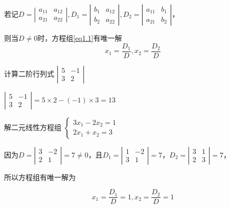 若记$D= \left|\begin{array}{ccc}
        a_{11} & a_{12} \\
        a_{21} & a_{22}
    \end{array}\right| , D_1=\left|\begin{array}{ccc}
        b_1 & a_{12} \\
        b_2 & a_{22}
    \end{array}\right| ,D_2= \left|\begin{array}{ccc}
        a_{11} & b_1 \\
        a_{21} & b_2
    \end{array}\right|  $，

则当$D \ne 0 $时，方程组\ref{eq1.1}有唯一解
$$
    x_1=\frac{D_1}{D},x_2=\frac{D_2}{D}
$$

\begin{example}
    计算二阶行列式
    $\left|\begin{array}{ccc}
            5 & -1 \\
            3 & 2
        \end{array}\right| $
\end{example}

\begin{solution}
    $\left|\begin{array}{ccc}
            5 & -1 \\
            3 & 2
        \end{array}\right| =5\times 2-(-1)\times 3=13$
\end{solution}

\begin{example}
    解二元线性方程组
    $
        \left\{
        \begin{array}{c}
            3x_1-2x_2=1 \\
            2x_1+x_2=3
        \end{array}
        \right.
    $
\end{example}

\begin{solution}
    因为$ D=\left|\begin{array}{ccc}
            3 & -2 \\
            2 & 1
        \end{array}\right| =7\ne 0 $，且$D_1=\left|\begin{array}{ccc}
            1 & -2 \\
            3 & 1
        \end{array}\right| =7 $，$D_2=\left|\begin{array}{ccc}
            3 & 1 \\
            2 & 3
        \end{array}\right| =7 $，

    所以方程组有唯一解为

    $$ x_1=\frac{D_1}{D}=1,x_2=\frac{D_2}{D}=1 $$
\end{solution}

